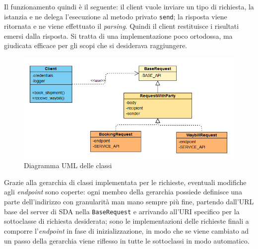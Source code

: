 Il funzionamento quindi è il seguente: il client vuole inviare un tipo di richiesta, la istanzia e ne delega l'esecuzione al metodo privato \texttt{send}; la risposta viene ritornata e ne viene effettuato il \textit{parsing}. Quindi il client restituisce i risultati emersi dalla risposta. Si tratta di una implementazione poco ortodossa, ma giudicata efficace per gli scopi che si desiderava raggiungere.

\begin{figure}[h!]
    \includegraphics[width=\textwidth]{figures/classdia.png}
    \caption[Diagramma UML delle classi]{Diagramma UML delle classi
    \label{fig:classdia}}
\end{figure}    

Grazie alla gerarchia di classi implementata per le richieste, eventuali modifiche agli \textit{endpoint} sono coperte: ogni membro della gerarchia possiede definisce una parte dell'indirizzo con granularità man mano sempre più fine, partendo dall'URL base del server di SDA nella \texttt{BaseRequest} e arrivando all'URI specifico per la sottoclasse di richiesta desiderata; sono le implementazioni delle richieste finali a comporre l'\textit{endpoint} in fase di inizializzazione, in modo che se viene cambiato ad un passo della gerarchia viene riflesso in tutte le sottoclassi in modo automatico.


